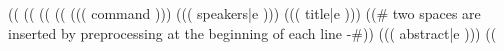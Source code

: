 

\noindent((%
((%
\workshopspace((%
((%
((( command ))){%
  ((( speakers|e )))%
}{%
  ((( title|e )))%
}{%
}{%
((# two spaces are inserted by preprocessing at the beginning of each line -#))
((( abstract|e )))%
}
((%


